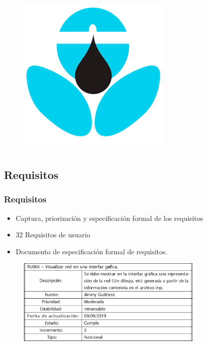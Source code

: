 \documentclass[9pt]{beamer}
\begin{document}
\begin{frame}
\begin{columns}
            \begin{figure}[H]
                \centering
                \includegraphics[width=\textwidth]{assets/Tecnologia/EpanetToolkit.png}
            \end{figure}
        \end{columns}
    \end{frame}

    \subsection{Requisitos}
    \begin{frame}
        \frametitle{Requisitos}                 
        
        \begin{itemize}
            \item Captura, priorización y especificación formal de los requisitos
            \item 32 Requisitos de usuario
            \item Documento de especificación formal de requisitos.
        \end{itemize}

        \begin{figure}
            \includegraphics[width=0.8\textwidth]{assets/Requisito.eps}
        \end{figure}

    \end{frame}
\end{document}
